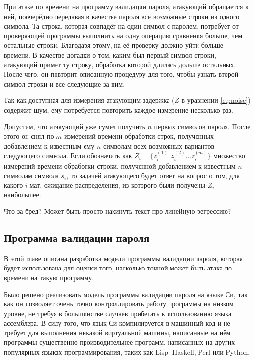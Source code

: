 При атаке по времени на программу валидации пароля, атакующий обращается к
ней, поочерёдно передавая в качестве пароля все возможные строки из одного
символа. Та строка, которая совпадёт на один символ с паролем, потребует от
проверяющей программы выполнить на одну операцию сравнения больше, чем остальные
строки. Благодаря этому, на её проверку должно уйти больше времени. В качестве
догадки о том, каким был первый символ строки, атакующий примет ту строку,
обработка которой длилась дольше остальных. После чего, он повторит описанную
процедуру для того, чтобы узнать второй символ строки и все следующие за ним.

Так как доступная для измерения атакующим задержка ($Z$ в уравнении
\ref{eq:noise}) содержит шум, ему потребуется повторить каждое измерение
несколько раз.

Допустим, что атакующий уже сумел получить $n$ первых символов пароля. После
этого он снял по $m$ измерений времени обработки строк, полученных добавлением
к известным ему $n$ символам всех возможных вариантов следующего символа. Если
обозначить как $Z_i = \{ z_i^{(1)}, z_i^{(2)} ... z_i^{(m)} \}$ множество
измерений времени обработки строки, полученной добавлением к известным $n$
символам символа $s_i$, то задачей атакующего будет ответ на вопрос о том,
для какого $i$ мат. ожидание распределения, из которого были получены $Z_i$
наибольшее.

Что за бред? Может быть просто накинуть текст про линейную регрессию?

\subsection{Программа валидации пароля}

В этой главе описана разработка модели программы валидации пароля, которая будет
использована для оценки того, насколько точной может быть атака по времени на
такую программу.

Было решено реализовать модель программы валидации пароля на языке Си, так
как он позволяет очень точно контроллировать работу программы на низком
уровне, не требуя в большинстве случаев прибегать к использованию языка
ассемблера. В силу того, что язык Си компилируется в машинный код и не требует
для выполнения никакой виртуальной машины, написанные на нём программы
существенно производительнее программ, написанных на других популярных языках
программирования, таких как Lisp, Haskell, Perl или Python.

